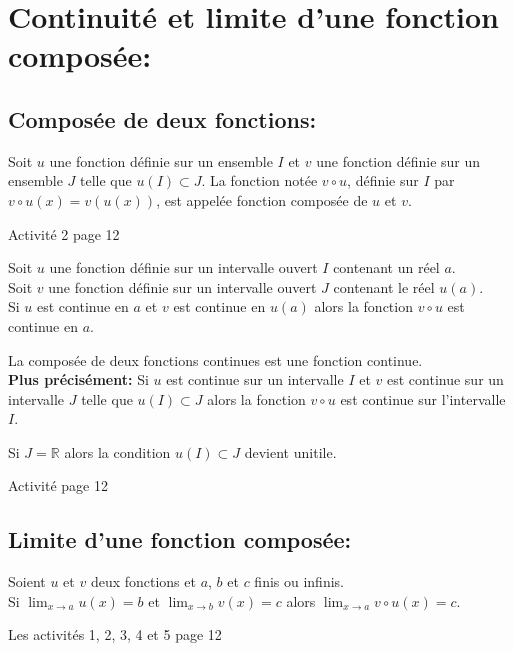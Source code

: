 \documentclass[12pt,a4paper,x11names,usenames,dvipsnames,svgnames,oneside]{book}
\def\skn{\tcbsubskin{skn}{empty}{frame code={%
}}}
\newenvironment{rem}{\skn\boxxr\tcbtitle}{\endboxxr}
\def\skn{\tcbsubskin{skn}{empty}{frame code={%
}}}
\newcounter{activ}
\def\R{\mathbb{R}}
\begin{document}
\section{Continuité et limite d'une fonction composée:}
\subsection{Composée de deux fonctions:}
\begin{df}
Soit $u$ une fonction définie sur un ensemble $I$ et $v$ une fonction définie sur un ensemble $J$ telle que $u(I) \subset J$. La fonction notée $v \circ u$, définie sur $I$ par $v\circ u(x)=v(u(x))$, est appelée fonction composée de $u$ et $v$.
\end{df}
\begin{act}
Activité 2 page 12
\end{act}
\begin{thr}
Soit $u$ une fonction définie sur un intervalle ouvert $I$ contenant un réel $a$.\\
Soit $v$ une fonction définie sur un intervalle ouvert $J$ contenant le réel $u(a)$.\\
Si $u$ est continue en $a$ et $v$ est continue en $u(a)$ alors la fonction $v\circ u$ est continue en $a$.
\end{thr}
\begin{dem}

\end{dem}
\begin{thr}
La composée de deux fonctions continues est une fonction continue.\\
\textbf{Plus précisément:} Si $u$ est continue sur un intervalle $I$ et $v$ est continue sur un intervalle $J$ telle que $u(I) \subset J$  alors la fonction $v\circ u$ est continue sur l'intervalle $I$.
\end{thr}
\begin{rem}
Si $J=\R$ alors la condition $u(I)\subset J$ devient unitile.
\end{rem}
\begin{act}
Activité page 12
\end{act}
\subsection{Limite d'une fonction composée:}
\begin{thr}
Soient $u$ et $v$ deux fonctions et $a$, $b$ et $c$ finis ou infinis.\\
Si $\lim_{x\to a}u(x)=b$ et $\lim_{x\to b}v(x)=c$ alors $\lim_{x\to a}v\circ u(x)=c$.
\end{thr}
\begin{act}
Les activités 1, 2, 3, 4 et 5 page 12
\end{act}
\end{document}
